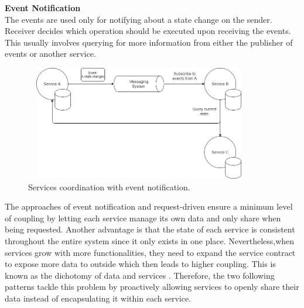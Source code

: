 \textbf{Event Notification}\\
The events are used only for notifying about a state change on the sender. Receiver decides which operation should be executed upon receiving the events. This usually involves querying for more information from either the publisher of events or another service.   
\begin{figure}[h]
	\centering
	\includegraphics[width=10cm,height=5cm]{images/eventnotification.png}
	\caption{Services coordination with event notification.}
	\label{fig:eventnotification}
\end{figure}

The approaches of event notification and request-driven ensure a minimum level of coupling by letting each service manage its own data and only share when being requested. Another advantage is that the state of each service is consistent throughout the entire system since it only exists in one place. Nevertheless,when services grow with more functionalities, they need to expand the service contract to expose more data to outside which then leads to higher coupling. This is known as the dichotomy of data and services \cite{stopford2018designing}. Therefore, the two following patterns tackle this problem by proactively allowing services to openly share their data instead of encapsulating it within each service.

